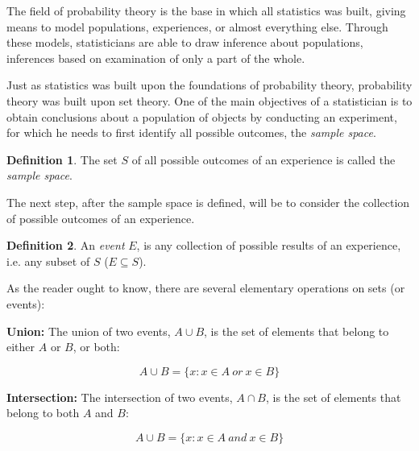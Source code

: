\documentclass[
  oneside,
  11pt, a4paper,
  footinclude=true,
  headinclude=true,
  cleardoublepage=empty
]{scrbook}
\theoremstyle{definition}
\newtheorem{definition}{Definition}[section]
\theoremstyle{definition}
\begin{document}
            The field of probability theory is the base in which all statistics was built, giving means to model populations, experiences, or almost everything else. Through these models, statisticians are able to draw inference about populations, inferences based on examination of only a part of the whole.
            
            Just as statistics was built upon the foundations of probability theory, probability theory was built upon set theory. One of the main objectives of a statistician is to obtain conclusions about a population of objects by conducting an experiment, for which he needs to first identify all possible outcomes, the \emph{sample space}.
            
            \begin{definition}{}
                The set $S$ of all possible outcomes of an experience is called the \emph{sample space}.
            \end{definition}
            
            The next step, after the sample space is defined, will be to consider the collection of possible outcomes of an experience.
            
            \begin{definition}{}
                An \emph{event} $E$, is any collection of possible results of an experience, i.e. any subset of $S$ ($E \subseteq S$).
            \end{definition}
            
            As the reader ought to know, there are several elementary operations on sets (or events):
            
            \vskip0.2cm
            \textbf{Union:} The union of two events, $A \cup B$, is the set of elements that belong to either $A$ or $B$, or both:
            
            \begin{equation}
                A \cup B = \{x : x \in A\ or\ x \in B\}
            \end{equation}{}
            
            \textbf{Intersection:} The intersection of two events, $A \cap B$, is the set of elements that belong to both $A$ and $B$:
            
            \begin{equation}
                A \cup B = \{x : x \in A\ and\ x \in B\}
            \end{equation}{}
            
\end{document}
